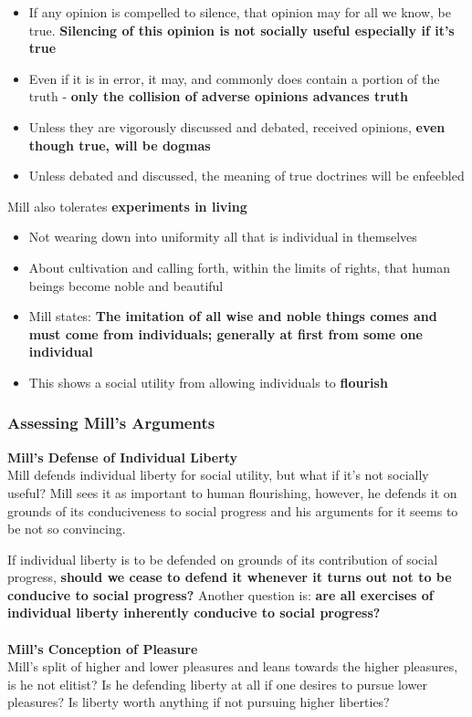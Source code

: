 \documentclass[12pt, letterpaper]{article}
\begin{document}
\begin{itemize}
	\item If any opinion is compelled to silence, that opinion may for all we know, be true. \textbf{Silencing of this opinion is not socially useful especially if it's true}
	\item Even if it is in error, it may, and commonly does contain a portion of the truth - \textbf{only the collision of adverse opinions advances truth}
	\item Unless they are vigorously discussed and debated, received opinions, \textbf{even though true, will be dogmas}
	\item Unless debated and discussed, the meaning of true doctrines will be enfeebled
\end{itemize}
Mill also tolerates \textbf{experiments in living}
\begin{itemize}
	\item Not wearing down into uniformity all that is individual in themselves
	\item About cultivation and calling forth, within the limits of rights, that human beings become noble and beautiful
	\item Mill states: \textbf{The imitation of all wise and noble things comes and must come from individuals; generally at first from some one individual}
	\item This shows a social utility from allowing individuals to \textbf{flourish}
\end{itemize}

\subsubsection{Assessing Mill's Arguments}
\textbf{Mill's Defense of Individual Liberty}\\
Mill defends individual liberty for social utility, but what if it's not socially useful?
Mill sees it as important to human flourishing, however, he defends it on grounds of its conduciveness to social progress and his arguments for it seems to be not so convincing.

If individual liberty is to be defended on grounds of its contribution of social progress, \textbf{should we cease to defend it whenever it turns out not to be conducive to social progress?} Another question is: \textbf{are all exercises of individual liberty inherently conducive to social progress?}\\\\
\textbf{Mill's Conception of Pleasure}\\
Mill's split of higher and lower pleasures and leans towards the higher pleasures, is he not elitist? Is he defending liberty at all if one desires to pursue lower pleasures? Is liberty worth anything if not pursuing higher liberties?
\end{document}
